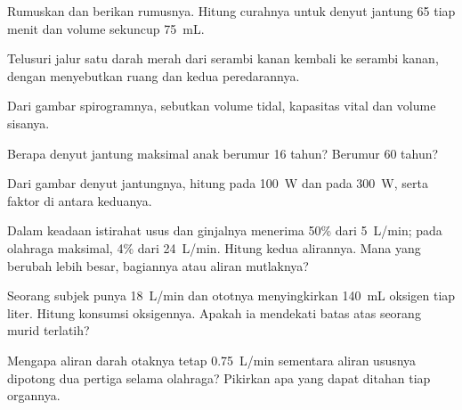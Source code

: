 \begin{exercise}[$\star$]\label{exo:g10:heart-lungs-effort:2}
Rumuskan  dan berikan rumusnya. Hitung curahnya untuk
denyut jantung 65 tiap menit dan volume sekuncup \qty{75}{mL}.
\end{exercise}

\begin{exercise}[$\star$]\label{exo:g10:heart-lungs-effort:3}
Telusuri jalur satu  darah merah dari serambi kanan kembali ke
serambi kanan, dengan menyebutkan ruang dan kedua peredarannya.
\end{exercise}

\begin{exercise}[$\star$]\label{exo:g10:heart-lungs-effort:4}
Dari gambar spirogramnya, sebutkan volume tidal, kapasitas vital dan
volume sisanya.
\end{exercise}

\begin{exercise}[$\star$]\label{exo:g10:heart-lungs-effort:5}
Berapa denyut jantung maksimal anak berumur 16 tahun? Berumur 60 tahun?
\end{exercise}

\begin{exercise}[$\star\star$]\label{exo:g10:heart-lungs-effort:6}
Dari gambar denyut jantungnya, hitung  pada \qty{100}{W}
dan pada \qty{300}{W}, serta faktor di antara keduanya.
\end{exercise}

\begin{exercise}[$\star\star$]\label{exo:g10:heart-lungs-effort:7}
Dalam keadaan istirahat usus dan ginjalnya menerima 50\% dari
\qty{5}{L/min}; pada olahraga maksimal, 4\% dari \qty{24}{L/min}.
Hitung kedua alirannya. Mana yang berubah lebih besar, bagiannya atau
aliran mutlaknya?
\end{exercise}

\begin{exercise}[$\star\star$]\label{exo:g10:heart-lungs-effort:8}
Seorang subjek punya  \qty{18}{L/min} dan ototnya
menyingkirkan \qty{140}{mL} oksigen tiap liter. Hitung konsumsi
oksigennya. Apakah ia mendekati batas atas seorang murid terlatih?
\end{exercise}

\begin{exercise}[$\star\star$]\label{exo:g10:heart-lungs-effort:9}
Mengapa aliran darah otaknya tetap \qty{0.75}{L/min} sementara aliran
ususnya dipotong dua pertiga selama olahraga? Pikirkan apa yang dapat
ditahan tiap organnya.
\end{exercise}

